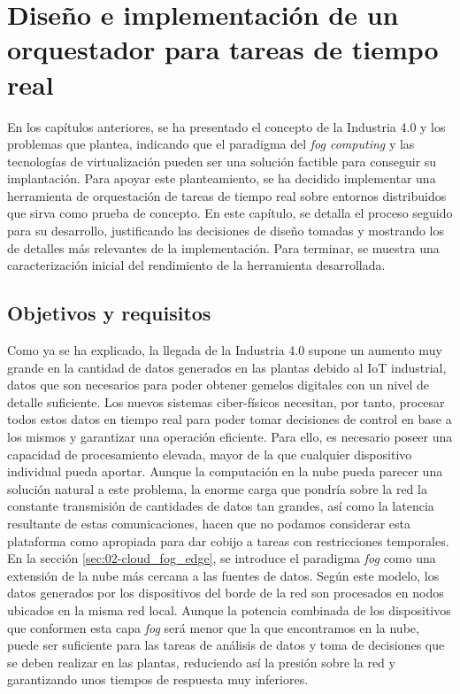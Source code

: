 \chapter{Diseño e implementación de un orquestador para tareas de tiempo real}

En los capítulos anteriores, se ha presentado el concepto de la Industria 4.0 y
los problemas que plantea, indicando que el paradigma del \textit{fog computing}
y las tecnologías de virtualización pueden ser una solución factible para
conseguir su implantación. Para apoyar este planteamiento, se ha decidido
implementar una herramienta de orquestación de tareas de tiempo real sobre
entornos distribuidos que sirva como prueba de concepto. En este capítulo, se
detalla el proceso seguido para su desarrollo, justificando las decisiones
de diseño tomadas y mostrando los de detalles más relevantes de la
implementación. Para terminar, se muestra una caracterización inicial del
rendimiento de la herramienta desarrollada.

\section{Objetivos y requisitos}

Como ya se ha explicado, la llegada de la Industria 4.0 supone un aumento muy
grande en la cantidad de datos generados en las plantas debido al IoT
industrial, datos que son necesarios para poder obtener gemelos digitales con un
nivel de detalle suficiente. Los nuevos sistemas ciber-físicos necesitan, por
tanto, procesar todos estos datos en tiempo real para poder tomar decisiones de
control en base a los mismos y garantizar una operación eficiente. Para ello, es
necesario poseer una capacidad de procesamiento elevada, mayor de la que
cualquier dispositivo individual pueda aportar. Aunque la computación en la nube
pueda parecer una solución natural a este problema, la enorme carga que pondría
sobre la red la constante transmisión de cantidades de datos tan grandes, así
como la latencia resultante de estas comunicaciones, hacen que no podamos
considerar esta plataforma como apropiada para dar cobijo a tareas con
restricciones temporales. En la sección \ref{sec:02-cloud_fog_edge}, se introduce
el paradigma \textit{fog} como una extensión de la nube más cercana a las
fuentes de datos. Según este modelo, los datos generados por los dispositivos
del borde de la red son procesados en nodos ubicados en la misma red local.
Aunque la potencia combinada de los dispositivos que conformen esta capa
\textit{fog} será menor que la que encontramos en la nube, puede ser suficiente
para las tareas de análisis de datos y toma de decisiones que se deben realizar
en las plantas, reduciendo así la presión sobre la red y garantizando unos
tiempos de respuesta muy inferiores.

